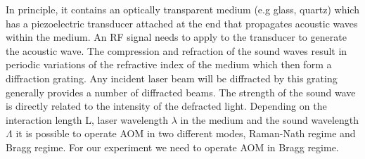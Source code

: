  In principle, it contains an optically transparent medium (e.g glass, quartz) which has a piezoelectric transducer attached at the end that propagates acoustic waves within the medium. An RF signal needs to apply to the transducer to generate the acoustic wave. The compression and refraction of the sound waves result in periodic variations of the refractive index of the medium which then form a diffraction grating. Any incident laser beam will be diffracted by this grating generally provides a number of diffracted beams. The strength of the sound wave is directly related to the intensity of the defracted light. Depending on the interaction length L, laser wavelength $\lambda$ in the medium and the sound wavelength $\Lambda$ it is possible to operate AOM in two different modes, Raman-Nath regime and Bragg regime. For our experiment we need to operate AOM in Bragg regime.

